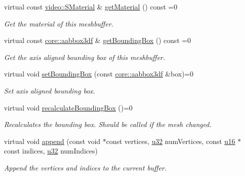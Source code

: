 \begin{DoxyCompactItemize}
virtual const \hyperlink{classirr_1_1video_1_1SMaterial}{video\+::\+S\+Material} \& \hyperlink{classirr_1_1scene_1_1IDynamicMeshBuffer_a3be83e4819e9f79a3d9b264eb8bf4cfc}{get\+Material} () const =0
\begin{DoxyCompactList}\small\item\em Get the material of this meshbuffer. \end{DoxyCompactList}\item 
virtual const \hyperlink{namespaceirr_1_1core_a60f4b4c744aba55f10530d503c6ecb04}{core\+::aabbox3df} \& \hyperlink{classirr_1_1scene_1_1IDynamicMeshBuffer_a9053baee5a13c8b51e306d99e5ef7427}{get\+Bounding\+Box} () const =0
\begin{DoxyCompactList}\small\item\em Get the axis aligned bounding box of this meshbuffer. \end{DoxyCompactList}\item 
virtual void \hyperlink{classirr_1_1scene_1_1IDynamicMeshBuffer_adbe127e3774de6ae7ce96cb534a336e5}{set\+Bounding\+Box} (const \hyperlink{namespaceirr_1_1core_a60f4b4c744aba55f10530d503c6ecb04}{core\+::aabbox3df} \&box)=0
\begin{DoxyCompactList}\small\item\em Set axis aligned bounding box. \end{DoxyCompactList}\item 
\mbox{\label{classirr_1_1scene_1_1IDynamicMeshBuffer_a0b3351f29578e0340c2e2ce3d03c9e59}} 
virtual void \hyperlink{classirr_1_1scene_1_1IDynamicMeshBuffer_a0b3351f29578e0340c2e2ce3d03c9e59}{recalculate\+Bounding\+Box} ()=0
\begin{DoxyCompactList}\small\item\em Recalculates the bounding box. Should be called if the mesh changed. \end{DoxyCompactList}\item 
virtual void \hyperlink{classirr_1_1scene_1_1IDynamicMeshBuffer_a0fb73ead4f2d2d86e9fef8768be1a1ff}{append} (const void $\ast$const vertices, \hyperlink{namespaceirr_a0416a53257075833e7002efd0a18e804}{u32} num\+Vertices, const \hyperlink{namespaceirr_ae9f8ec82692ad3b83c21f555bfa70bcc}{u16} $\ast$const indices, \hyperlink{namespaceirr_a0416a53257075833e7002efd0a18e804}{u32} num\+Indices)
\begin{DoxyCompactList}\small\item\em Append the vertices and indices to the current buffer. \end{DoxyCompactList}\item 

\end{DoxyCompactItemize}
